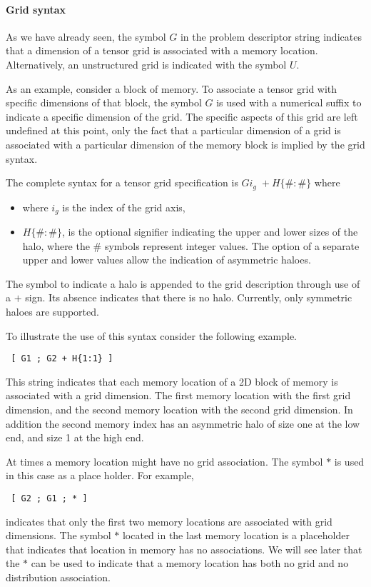 \paragraph{Grid syntax}
As we have already seen, the symbol $G$ in the problem descriptor string indicates 
that a dimension of a tensor grid is associated with a memory location. 
Alternatively, an unstructured grid is indicated with the symbol $U$.

As an example, consider a block of memory. To associate a tensor grid with specific dimensions of that block, 
the symbol $G$ is used with a numerical  suffix  to indicate a specific dimension of the grid. 
The specific aspects of this grid are left undefined at this point, only the fact 
that a particular dimension of a grid is associated with a particular dimension 
of the memory block is implied by the grid syntax. 

The complete syntax for a tensor grid specification is $G i_g \; + H \{ \# : \# \}$ where
\begin{itemize}
	\item where $i_g$ is the index of the grid axis,
	\item $H \{ \# : \# \}$, is the optional signifier indicating the upper and lower sizes of the halo, where the $\#$ symbols represent integer values. The option of a separate upper and lower values allow the indication of asymmetric haloes.
\end{itemize}
The symbol to indicate a halo is appended to the grid description through use of a $+$ sign. Its absence indicates that there is no halo. Currently, only symmetric haloes are supported.

To illustrate the use of this syntax consider the following example.
\begin{center}
\begin{verbatim}
 [ G1 ; G2 + H{1:1} ]
\end{verbatim}
\end{center}
This string indicates that each memory location of a 2D block of memory is associated with a grid dimension. 
The first memory location with the first grid dimension, and the second memory location 
with the second grid dimension. In addition the second memory index has an asymmetric halo 
of size one at the low end, and size 1 at the high end.

At times a memory location might have no grid association. 
The symbol $\ast$ is used in this case as a place holder. For example, 
\begin{center}
\begin{verbatim}
 [ G2 ; G1 ; * ]
\end{verbatim}
\end{center}
indicates that only the first two memory locations are associated with grid dimensions. 
The symbol $\ast$ located in the last memory location is a placeholder that indicates 
that location in memory has no associations. 
We will see later that the $\ast$ can be used to indicate that a memory location 
has both no grid and no distribution association. 


